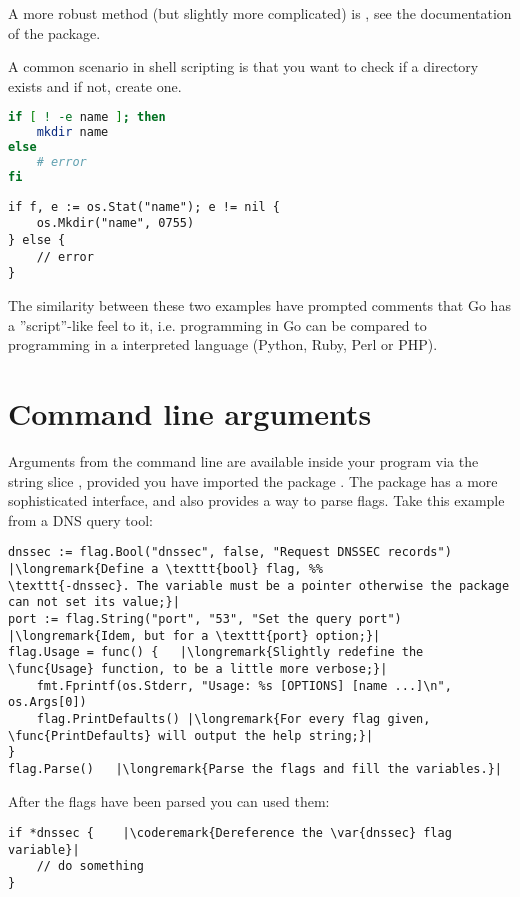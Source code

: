A more robust method (but slightly more complicated) is , see the documentation
of the  package.

A common scenario in shell scripting is that you want to check if a directory
exists and if not, create one. 

\begin{minipage}{.5\textwidth}
\begin{lstlisting}[language=sh,caption={Create a directory with the shell}]
if [ ! -e name ]; then
    mkdir name
else
    # error
fi
\end{lstlisting}
\end{minipage}
\hspace{1em}
\begin{minipage}{.5\textwidth}
\begin{lstlisting}[caption={Create a directory with Go}]
if f, e := os.Stat("name"); e != nil {
    os.Mkdir("name", 0755)
} else {
    // error
}
\end{lstlisting}
\end{minipage}
The similarity between these two examples have prompted comments that Go has a
''script''-like feel to it, i.e. programming in Go can be compared to programming in 
a interpreted language (Python, Ruby, Perl or PHP).

\section{Command line arguments}
\label{sec:option parsing}
Arguments from the command line are available inside your program via
the string slice , provided you have imported the package
. The  package has a more sophisticated
interface, and also provides a way to parse flags. Take this example
from a DNS query tool:
\begin{lstlisting}
dnssec := flag.Bool("dnssec", false, "Request DNSSEC records") |\longremark{Define a \texttt{bool} flag, %%
\texttt{-dnssec}. The variable must be a pointer otherwise the package can not set its value;}|
port := flag.String("port", "53", "Set the query port")      |\longremark{Idem, but for a \texttt{port} option;}|
flag.Usage = func() {   |\longremark{Slightly redefine the \func{Usage} function, to be a little more verbose;}|
    fmt.Fprintf(os.Stderr, "Usage: %s [OPTIONS] [name ...]\n", os.Args[0])
    flag.PrintDefaults() |\longremark{For every flag given, \func{PrintDefaults} will output the help string;}|
}
flag.Parse()   |\longremark{Parse the flags and fill the variables.}|
\end{lstlisting}
\showremarks
After the flags have been parsed you can used them:
\begin{lstlisting}
if *dnssec {    |\coderemark{Dereference the \var{dnssec} flag variable}|
    // do something
}
\end{lstlisting}

